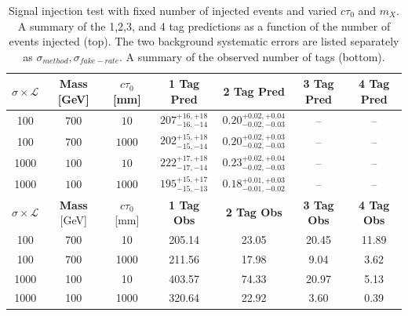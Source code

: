 \begin{table}
\caption{Signal injection test with fixed number of injected events and varied $c\tau_0$ and $m_X$. 
A summary of the 1,2,3, and 4 tag predictions as a function of the number of events injected (top). The two background systematic errors are
listed separately as $\sigma_{method},\sigma_{fake-rate}$.  A summary of the observed number of tags (bottom). 
\label{tab:700_100_injection_summary}}
\begin{center}
\begin{tabular}{ccccccc}
\hline 
$\sigma\times\mathcal{L}$ & \textbf{Mass} [GeV] & $c\tau_0$ [mm]  & \textbf{1 Tag Pred} & \textbf{2 Tag Pred} & \textbf{3 Tag Pred} &\textbf{4 Tag Pred} \\
\hline
100 &$ 700 $&$ 10 $&$ 207^{+16,+18}_{-16,-14} $&$0.20^{+0.02,+0.04}_{-0.02,-0.03} $&--&-- \\
100 &$ 700 $&$ 1000 $&$ 202^{+15,+18}_{-15,-14} $&$0.20^{+0.02,+0.03}_{-0.02,-0.03} $&--&--\\
1000 &$ 100 $&$ 10 $&$222^{+17,+18}_{-17,-14} $&$0.23^{+0.02,+0.04}_{-0.02,-0.03} $&--&-- \\
1000 &$ 100 $&$ 1000 $&$ 195^{+15,+17}_{-15,-13} $&$0.18^{+0.01,+0.03}_{-0.01,-0.02} $&--&-- \\ 
\hline 
\hline 
$\sigma\times\mathcal{L}$ & \textbf{Mass} [GeV] & $c\tau_0$ [mm]  & \textbf{1 Tag Obs} & \textbf{2 Tag Obs} & \textbf{3 Tag Obs} &\textbf{4 Tag Obs} \\
\hline
100 & 700 & 10 & 205.14 & 23.05 & 20.45 & 11.89\\
100 & 700 & 1000 & 211.56 & 17.98 & 9.04 & 3.62 \\
1000 & 100 & 10 & 403.57 & 74.33 & 20.97 & 5.13 \\
1000 & 100 & 1000 & 320.64 & 22.92 & 3.60 & 0.39 \\
\hline 
\end{tabular} 
\end{center}
\end{table}

